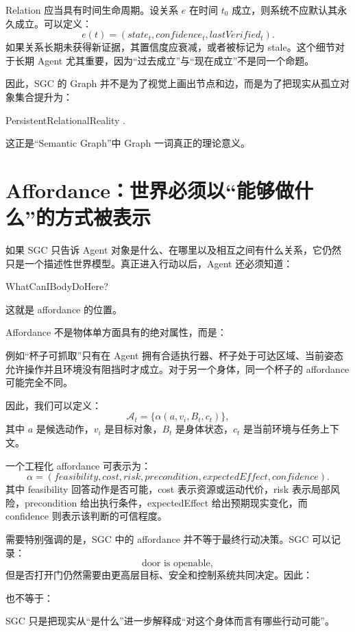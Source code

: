Relation 应当具有时间生命周期。设关系 $e$ 在时间 $t_0$ 成立，则系统不应默认其永久成立。可以定义：
\[
e(t)=
\left(
state_t,
confidence_t,
lastVerified_t
\right).
\]
如果关系长期未获得新证据，其置信度应衰减，或者被标记为 stale。这个细节对于长期 Agent 尤其重要，因为“过去成立”与“现在成立”不是同一个命题。

因此，SGC 的 Graph 并不是为了视觉上画出节点和边，而是为了把现实从孤立对象集合提升为：
\begin{statementbox}
PersistentRelationalReality .
\end{statementbox}
这正是“Semantic Graph”中 Graph 一词真正的理论意义。

\section{Affordance：世界必须以“能够做什么”的方式被表示}

如果 SGC 只告诉 Agent 对象是什么、在哪里以及相互之间有什么关系，它仍然只是一个描述性世界模型。真正进入行动以后，Agent 还必须知道：
\begin{statementbox}
WhatCanIBodyDoHere?
\end{statementbox}
这就是 affordance 的位置。

Affordance 不是物体单方面具有的绝对属性，而是：
\begin{statementbox}
\centering
{}
\end{statementbox}
例如“杯子可抓取”只有在 Agent 拥有合适执行器、杯子处于可达区域、当前姿态允许操作并且环境没有阻挡时才成立。对于另一个身体，同一个杯子的 affordance 可能完全不同。

因此，我们可以定义：
\[
\mathcal A_t
=
\{
\alpha(a,v_i,B_t,c_t)
\},
\]
其中 $a$ 是候选动作，$v_i$ 是目标对象，$B_t$ 是身体状态，$c_t$ 是当前环境与任务上下文。

一个工程化 affordance 可表示为：
\[
\alpha
=
(
feasibility,
cost,
risk,
precondition,
expectedEffect,
confidence
).
\]
其中 feasibility 回答动作是否可能，cost 表示资源或运动代价，risk 表示局部风险，precondition 给出执行条件，expectedEffect 给出预期现实变化，而 confidence 则表示该判断的可信程度。

需要特别强调的是，SGC 中的 affordance 并不等于最终行动决策。SGC 可以记录：
\[
\text{door is openable},
\]
但是否打开门仍然需要由更高层目标、安全和控制系统共同决定。因此：
\begin{statementbox}
\centering
{}
\end{statementbox}
也不等于：
\begin{statementbox}
\centering
{}
\end{statementbox}
SGC 只是把现实从“是什么”进一步解释成“对这个身体而言有哪些行动可能”。

